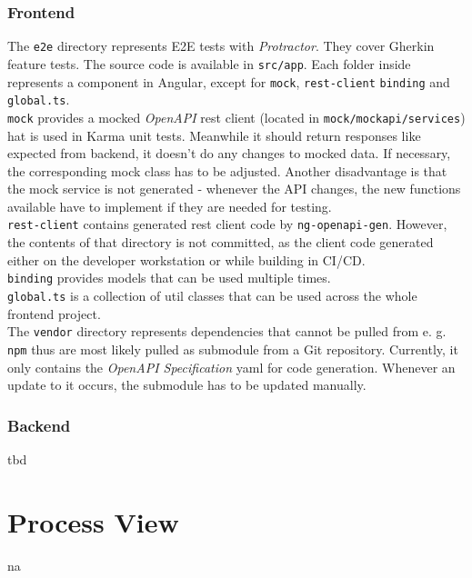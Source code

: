 \documentclass[a4paper,12pt,chapterprefix=false,bibliography=totoc,listof=totoc,]{scrreprt}
\begin{document}
\subsection{Frontend}
The \texttt{e2e} directory represents E2E tests with \textit{Protractor}. They cover Gherkin feature tests. The source code is available in \texttt{src/app}. Each folder inside represents a component in Angular, except for \texttt{mock}, \texttt{rest-client} \texttt{binding} and \texttt{global.ts}. \\
\texttt{mock} provides a mocked \textit{OpenAPI} \gls{rest} client (located in \texttt{mock/mockapi/services}) hat is used in Karma unit tests. Meanwhile it should return responses like expected from backend, it doesn't do any changes to mocked data. If necessary, the corresponding mock class has to be adjusted. Another disadvantage is that the mock service is not generated - whenever the API changes, the new functions available have to implement if they are needed for testing. \\
\texttt{rest-client} contains generated \gls{rest} client code by \texttt{ng-openapi-gen}. However, the contents of that directory is not committed, as the client code generated either on the developer workstation or while building in CI/CD. \\
\texttt{binding} provides models that can be used multiple times. \\
\texttt{global.ts} is a collection of util classes that can be used across the whole frontend project. \\
The \texttt{vendor} directory represents dependencies that cannot be pulled from e. g. \texttt{npm} thus are most likely pulled as submodule from a Git repository. Currently, it only contains the \textit{OpenAPI Specification} \gls{yaml} for code generation. Whenever an update to it occurs, the submodule has to be updated manually.

\subsection{Backend}
\gls{tbd}

\chapter{Process View}
\gls{na}
\end{document}
